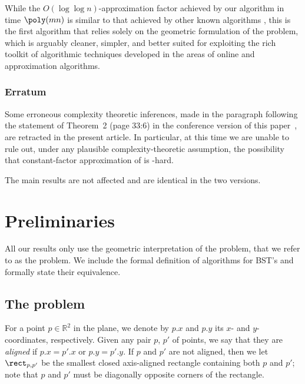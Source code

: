 \documentclass{toc}
\begin{document}
While the $O(\log\log n)$-approximation factor achieved by our algorithm in time $\poly(mn)$ is similar to that achieved by other known algorithms  \cite{tango,chain_splay,multisplay}, this is the first algorithm that relies solely on the geometric formulation of the problem, which is arguably cleaner, simpler, and better suited for exploiting the rich toolkit of algorithmic techniques developed in the areas of online and approximation algorithms.

\subsubsection{Erratum} 
Some erroneous complexity theoretic inferences, made
%
%
in the paragraph following the statement of Theorem~2 (page 33:6) %
in the conference version of this paper~\cite{conf-version}, %
are retracted in the present article.  
%
In particular, at this time we are unable to rule out, under any
plausible complexity-theoretic assumption, the possibility
that constant-factor approximation of \minsat is \NP-hard.  %
%
%

The main results are not affected and are identical in the two versions. 

%

\section{Preliminaries}\label{sec: prelims}

%

All our results only use the geometric interpretation of the problem, that we refer to as the \minsat problem. 
We include the formal definition of algorithms for BST's and formally state their equivalence.  
%


%

	\subsection{The \minsat problem}
	\label{sec: problem def}

	For a point $p \in {\mathbb R}^2$ in the plane, we denote by $p.x$ and $p.y$ its $x$- and $y$-coordinates, respectively. 
	Given any pair $p$, $p'$ of points, we say that they are \emph{aligned} if $p.x=p'.x$ or $p.y=p'.y$. If $p$ and $p'$ are not aligned, then we let $\rect_{p,p'}$ be the smallest closed axis-aligned rectangle containing both $p$ and $p'$; note that $p$ and $p'$ must be diagonally opposite corners of the rectangle.
	 
\end{document}
